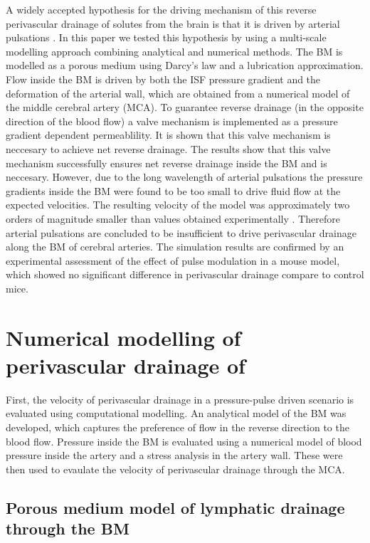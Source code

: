 \documentclass[a4paper,titlepage]{scrartcl}
\begin{document}
A widely accepted hypothesis for the driving mechanism of this reverse perivascular drainage of solutes from the brain is that it is driven by arterial pulsations \cite{Weller2009,Carare2008,Hawkes2011,Morris2014,Schley2006,Attems2011,Wang2011,Iliff2012,Asgari2015,Sharp2015,Weller2015a}. In this paper we tested this hypothesis by using a multi-scale modelling approach combining analytical and numerical methods. The BM is modelled as a porous medium using Darcy's law and a lubrication approximation. Flow inside the BM is driven by both the ISF pressure gradient and the deformation of the arterial wall, which are obtained from a numerical model of the middle cerebral artery (MCA). To guarantee reverse drainage (\ie in the opposite direction of the blood flow) a valve mechanism is implemented as a pressure gradient dependent permeablility. It is shown that this valve mechanism is neccesary to achieve net reverse drainage. The results show that this valve mechanism successfully ensures net reverse drainage inside the BM and is neccesary. However, due to the long wavelength of arterial pulsations the pressure gradients inside the BM were found to be too small to drive fluid flow at the expected velocities. The resulting velocity of the model was approximately two orders of magnitude smaller than values obtained experimentally \cite{Carare2008}. Therefore arterial pulsations are concluded to be insufficient to drive perivascular drainage along the BM of cerebral arteries. The simulation results are confirmed by an experimental assessment of the effect of pulse modulation in a mouse model, which showed no significant difference in perivascular drainage compare to control mice.


\section{Numerical modelling of perivascular drainage of \Ab}

First, the velocity of perivascular drainage in a pressure-pulse driven scenario is evaluated using computational modelling. An analytical model of the BM was developed, which captures the preference of flow in the reverse direction to the blood flow. Pressure inside the BM is evaluated using a numerical model of blood pressure inside the artery and a stress analysis in the artery wall. These were then used to evaulate the velocity of perivascular drainage through the MCA.


\subsection{Porous medium model of lymphatic drainage through the BM}
\label{sec:diodemodel}
\end{document}
